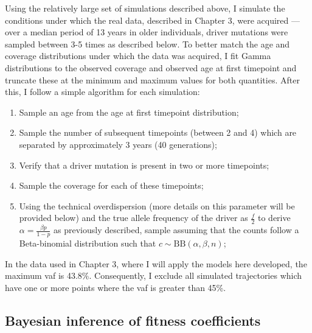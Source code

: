 Using the relatively large set of simulations described above, I simulate the conditions under which the real data, described in Chapter 3, were acquired --- over a median period of 13 years in older individuals, driver mutations were sampled between 3-5 times as described below. To better match the age and coverage distributions under which the data was acquired, I fit Gamma distributions to the observed coverage and observed age at first timepoint and truncate these at the minimum and maximum values for both quantities. After this, I follow a simple algorithm for each simulation:

\begin{enumerate}
    \item Sample an age from the age at first timepoint distribution;
    \item Sample the number of subsequent timepoints (between 2 and 4) which are separated by approximately 3 years (40 generations);
    \item Verify that a driver mutation is present in two or more timepoints;
    \item Sample the coverage for each of these timepoints;
    \item Using the technical overdispersion (more details on this parameter will be provided below) and the true allele frequency of the driver as $\frac{f}{2}$ to derive $\alpha = \frac{\beta p}{1-p}$ as previously described, sample assuming that the counts follow a Beta-binomial distribution such that $c \sim \mathrm{BB}(\alpha,\beta,n)$;
\end{enumerate}

In the data used in Chapter 3, where I will apply the models here developed, the maximum \ac{vaf} is 43.8\%. Consequently, I exclude all simulated trajectories which have one or more points where the \ac{vaf} is greater than 45\%.

\subsection{Bayesian inference of fitness coefficients}

